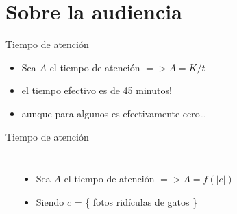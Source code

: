 \documentclass{beamer}
\begin{document}
\section{Sobre la audiencia}

\begin{frame}{Tiempo de atenci\'on}
 {
    \begin{itemize}
        \item Sea $A$ el tiempo de atenci\'on $ => A = K / t$ \ \bigskip
        \item el tiempo efectivo es de 45 minutos! \ \bigskip
        \item aunque para algunos es efectivamente cero\ldots
    \end{itemize}
}  {
    \begin{center}
    \end{center}
}
\end{frame}


\begin{frame}{Tiempo de atenci\'on}
\begin{columns}[onlytextwidth]
    \begin{center}
    \end{center}
    \begin{itemize}
        \item Sea $A$ el tiempo de atenci\'on $ => A = f(|c|)$ \ \bigskip
        \item Siendo $c$ = \{ fotos rid\'iculas de gatos \} \ \bigskip
    \end{itemize}
\end{columns}
\end{frame}
\end{document}
